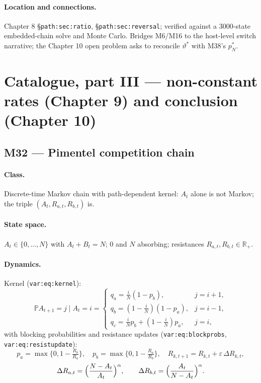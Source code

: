 \documentclass[11pt,a4paper]{article}
\newcommand{\PR}{\mathbb{P}}
\begin{document}
\paragraph{Location and connections.} Chapter 8
\S\texttt{path:sec:ratio}, \S\texttt{path:sec:reversal}; verified against a
3000-state embedded-chain solve and Monte Carlo. Bridges M6/M16 to the
host-level switch narrative; the Chapter 10 open problem asks to reconcile
$\vartheta^*$ with M38's $p_N^*$.

\section{Catalogue, part III --- non-constant rates (Chapter 9) and conclusion (Chapter 10)}

\subsection{M32 --- Pimentel competition chain}

\paragraph{Class.} Discrete-time Markov chain with path-dependent kernel:
$A_t$ alone is not Markov; the triple $(A_t,R_{a,t},R_{b,t})$ is.

\paragraph{State space.} $A_t\in\{0,\ldots,N\}$ with $A_t+B_t=N$; $0$ and
$N$ absorbing; resistances $R_{a,t},R_{b,t}\in\mathbb R_+$.

\paragraph{Dynamics.} Kernel (\texttt{var:eq:kernel}):
\[
\PR{A_{t+1}=j\mid A_t=i}=
\begin{cases}
q_a=\frac iN(1-p_b), & j=i+1,\\[2pt]
q_b=(1-\frac iN)(1-p_a), & j=i-1,\\[2pt]
q_c=\frac iN p_b+(1-\frac iN)p_a, & j=i,
\end{cases}
\]
with blocking probabilities and resistance updates
(\texttt{var:eq:blockprobs}, \texttt{var:eq:resistupdate}):
\[
p_a=\max\{0,1-\tfrac{R_b}{R_a}\},\quad p_b=\max\{0,1-\tfrac{R_a}{R_b}\},
\quad
R_{k,t+1}=R_{k,t}+\varepsilon\,\Delta R_{k,t},
\]
\[
\Delta R_{a,t}=\Bigl(\frac{N-A_t}{A_t}\Bigr)^{\alpha},\qquad
\Delta R_{b,t}=\Bigl(\frac{A_t}{N-A_t}\Bigr)^{\alpha}.
\]
\end{document}
